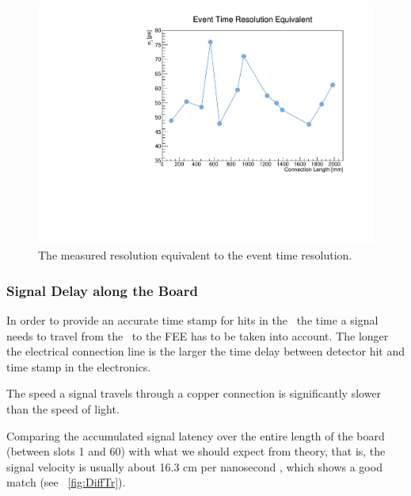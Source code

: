 \documentclass[../BTOF_summary.tex]{subfiles}
\begin{document}
\begin{figure}[htbp]
    \centering
    \includegraphics[scale=0.5]{Pictures/TimeRes_event.pdf}
    \caption{The measured resolution equivalent to the event time resolution.}
    \label{fig:TR}
\end{figure}

\subsubsection{Signal Delay along the Board}

In order to provide an accurate time stamp for hits in the \btofD\ the time a signal needs to travel from the \sipms\ to the FEE has to be taken into account. The longer the electrical connection line is the larger the time delay between detector hit and time stamp in the electronics.

The speed a signal travels through a copper connection is significantly slower than the speed of light.

Comparing the accumulated signal latency over the entire length of the board (between slots 1 and 60) with what we should expect from theory, that is, the signal velocity is usually about 16.3 cm per nanosecond \cite{bril,paul}, which shows a good match (see \fig~\ref{fig:DiffTr}).
\end{document}
